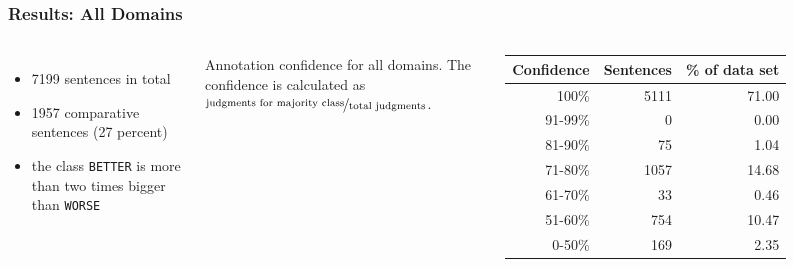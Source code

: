 \documentclass[11pt,aspectratio=169,usenames,dvipsnames]{beamer}
\begin{document}
    \begin{frame}[t]
        \frametitle{Results: All Domains}



        \begin{columns}
            \column{2in}
            \begin{itemize}
                \item 7199 sentences in total
                \item 1957 comparative sentences (27 percent)
                \item the class \texttt{BETTER} is more than two times bigger than \texttt{WORSE}
            \end{itemize}
            \column{3in}
            Annotation confidence for all domains. The confidence is calculated as $\nicefrac{\text{judgments for majority class}}{\text{total judgments}}$.
            \begin{tabular}{@{}rrr@{}}
                \toprule
                Confidence & Sentences & \% of data set \\
                \midrule
                100\%    & 5111 & 71.00     \\
                91-99\%    & 0 & 0.00     \\
                81-90\%    & 75 & 1.04     \\
                71-80\%    & 1057 & 14.68     \\
                61-70\%    & 33 & 0.46     \\
                51-60\%    & 754 & 10.47     \\
                0-50\%    & 169 & 2.35     \\
                \bottomrule
            \end{tabular}

        \end{columns}


    \end{frame}
\end{document}
